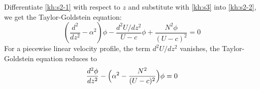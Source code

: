 Differentiate \eqref{kh:s2-1} with respect to $z$ and substitute
with \eqref{kh:s3} into \eqref{kh:s2-2}, we get the Taylor-Goldstein
equation:
\begin{equation}\label{tay:eq}
    \boxed{(\frac{d^2}{dz^2}-\alpha^2)\phi-\frac{d^2U/dz^2}{U-c}\phi+\frac{N^2\phi}{(U-c)^2}=0}
\end{equation}
For a piecewise linear velocity profile, the term $d^2U/dz^2$
vanishes, the Taylor-Goldstein equation reduces to
\begin{equation}\label{tay:eq2}
    \frac{d^2\phi}{dz^2}-\Bigl(\alpha^2-\frac{N^2}{(U-c)^2}\Bigr)\phi=0
\end{equation}
